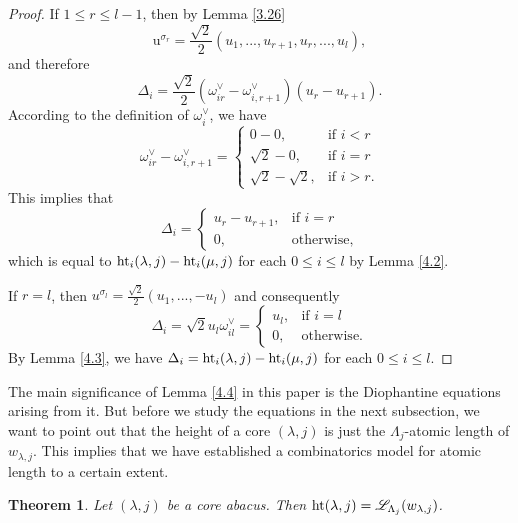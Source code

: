 \documentclass[11pt]{amsart}
\theoremstyle{plain}
\numberwithin{equation}{subsection}
\newtheorem{theorem}{Theorem}[section]
\newcommand{\lam}{\lambda}
\begin{document}
\begin{proof}
If $1\leq r\leq l-1$, then by Lemma \ref{3.26} $$\mathrm{u}^{\sigma_r}=\frac{\sqrt{2}}{2}(u_1,...,u_{r+1},u_{r},...,u_l),$$ and therefore
$$\Delta_i = \frac{\sqrt{2}}{2}(\omega_{ir}^{\vee}-\omega_{i,r+1}^{\vee})(u_r-u_{r+1}).$$ According to the definition of $\omega_{i}^{\vee}$, we have
$$\omega_{ir}^{\vee}-\omega_{i,r+1}^{\vee}=
\begin{cases}
  0-0, & \mbox{if } i<r \\
  \sqrt{2}-0, & \mbox{if } i=r \\
  \sqrt{2}-\sqrt{2}, & \mbox{if } i>r.
\end{cases}$$
This implies that
$$\Delta_i = 
\begin{cases}
u_r-u_{r+1}, & \mbox{if } i=r \\
0, & \mbox{otherwise},
\end{cases}$$
which is equal to ${\rm ht}_i(\lam,j)-{\rm ht}_i(\mu,j)$ for each $0\leq i\leq l$ by Lemma \ref{4.2}.

If $r=l$, then $u^{\sigma_l}=\frac{\sqrt{2}}{2}(u_1,...,-u_l)$ and consequently 
$$\Delta_i = \sqrt{2}u_l\omega_{il}^{\vee}=
\begin{cases}
u_l, & \mbox{if } i=l \\
0, & \mbox{otherwise}.
\end{cases}$$
By Lemma \ref{4.3}, we have $\Delta_i={\rm ht}_i(\lam,j)-{\rm ht}_i(\mu,j)$ for each $0\leq i\leq l$.
\end{proof}

The main significance of Lemma \ref{4.4} in this paper is the Diophantine equations arising from it. 
But before we study the equations in the next subsection, we want to point out that the height of a core $(\lam, j)$
is just the $\Lambda_j$-atomic length of $w_{\lam, j}$. This implies that we have established a combinatorics model for atomic length to a certain extent.

\begin{theorem}\label{4.5}
Let $(\lam, j)$ be a core abacus. Then ${\rm ht}(\lam,j)=\mathscr{L}_{\Lambda_j}(w_{\lam, j})$.
\end{theorem}
\end{document}
